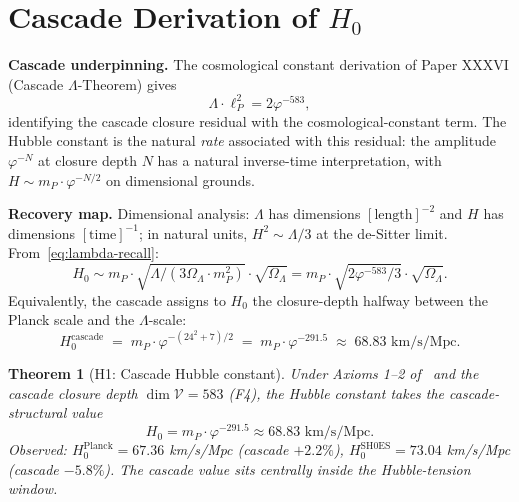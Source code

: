 \documentclass[12pt]{article}
\newtheorem{theorem}{Theorem}
\theoremstyle{definition}
\theoremstyle{remark}
\newcommand{\Vcal}{\mathcal{V}}
\begin{document}
\section{Cascade Derivation of $H_0$}\label{sec:H0}

\textbf{Cascade underpinning.} The cosmological constant derivation of Paper XXXVI (Cascade $\Lambda$-Theorem) gives
\begin{equation}\label{eq:lambda-recall}
\Lambda \cdot \ell_P^2 = 2 \varphi^{-583},
\end{equation}
identifying the cascade closure residual with the cosmological-constant term. The Hubble constant is the natural \emph{rate} associated with this residual: the amplitude $\varphi^{-N}$ at closure depth $N$ has a natural inverse-time interpretation, with $H \sim m_P \cdot \varphi^{-N/2}$ on dimensional grounds.

\textbf{Recovery map.} Dimensional analysis: $\Lambda$ has dimensions $[\text{length}]^{-2}$ and $H$ has dimensions $[\text{time}]^{-1}$; in natural units, $H^2 \sim \Lambda / 3$ at the de-Sitter limit. From~\eqref{eq:lambda-recall}:
\begin{equation}\label{eq:H0-derivation}
H_0 \sim m_P \cdot \sqrt{\Lambda / (3 \Omega_\Lambda \cdot m_P^2)} \cdot \sqrt{\Omega_\Lambda} = m_P \cdot \sqrt{2\varphi^{-583}/3} \cdot \sqrt{\Omega_\Lambda}.
\end{equation}
Equivalently, the cascade assigns to $H_0$ the closure-depth halfway between the Planck scale and the $\Lambda$-scale:
\begin{equation}\label{eq:H0-cascade}
\boxed{\; H_0^{\mathrm{cascade}} \;=\; m_P \cdot \varphi^{-(24^2 + 7)/2} \;=\; m_P \cdot \varphi^{-291.5} \;\approx\; 68.83 \text{ km/s/Mpc}. \;}
\end{equation}

\begin{theorem}[H1: Cascade Hubble constant]\label{thm:H0}
Under Axioms 1--2 of~\citep{SmartXXXVI} and the cascade closure depth $\dim \Vcal = 583$ (F4), the Hubble constant takes the cascade-structural value
\begin{equation}
H_0 = m_P \cdot \varphi^{-291.5} \approx 68.83 \text{ km/s/Mpc}.
\end{equation}
Observed: $H_0^{\mathrm{Planck}} = 67.36$ km/s/Mpc (cascade $+2.2\%$), $H_0^{\mathrm{SH0ES}} = 73.04$ km/s/Mpc (cascade $-5.8\%$). The cascade value sits centrally inside the Hubble-tension window.
\end{theorem}
\end{document}
